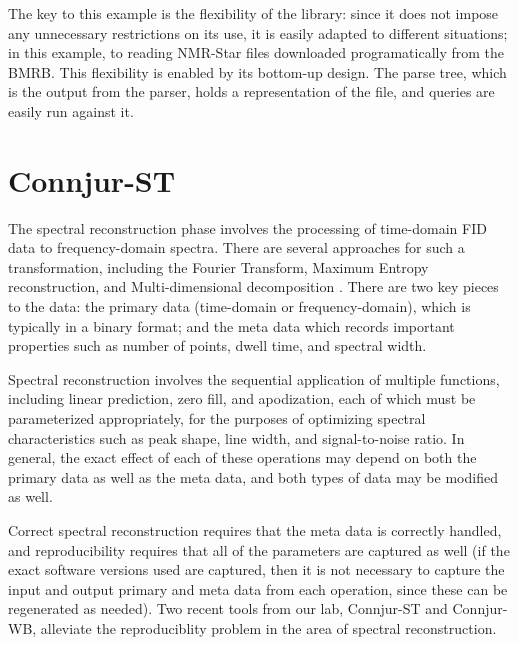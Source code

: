 The key to this example is the flexibility of the library: since it does not
impose any unnecessary restrictions on its use, it is easily adapted to
different situations; in this example, to reading NMR-Star files downloaded
programatically from the BMRB.  This flexibility is enabled by its bottom-up
design.  The parse tree, which is the output from the parser, holds a 
representation of the file, and queries are easily run against it.


\section{Connjur-ST}
The spectral reconstruction phase involves the processing of time-domain 
FID data to frequency-domain spectra.  There are several approaches for such
a transformation, including the Fourier Transform, Maximum Entropy reconstruction,
and Multi-dimensional decomposition \cite{nmrpipe, rnmrtk, mdd}.  There are
two key pieces to the data: the primary data (time-domain or frequency-domain),
which is typically in a binary format; and the meta data which records
important properties such as number of points, dwell time, and spectral width.

Spectral reconstruction involves the sequential application
of multiple functions, including linear prediction, zero fill, and apodization,
each of which must be parameterized appropriately, for the purposes of 
optimizing spectral characteristics such as peak shape, line width, and
signal-to-noise ratio.  In general, the exact effect of each of these operations
may depend on both the primary data as well as the meta data, and both types of
data may be modified as well.

Correct spectral reconstruction requires that the meta data is correctly 
handled, and reproducibility requires that all of the parameters are captured
as well (if the exact software versions used are captured, then it is not
necessary to capture the input and output primary and meta data from each
operation, since these can be regenerated as needed).  Two recent tools from
our lab, Connjur-ST \cite{connjur-st} and Connjur-WB, alleviate the
reproduciblity problem in the area of spectral reconstruction.

